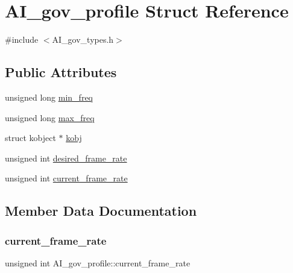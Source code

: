 \hypertarget{structAI__gov__profile}{}\section{A\+I\+\_\+gov\+\_\+profile Struct Reference}
\label{structAI__gov__profile}


{\ttfamily \#include $<$A\+I\+\_\+gov\+\_\+types.\+h$>$}

\subsection*{Public Attributes}
\begin{DoxyCompactItemize}
\item 
unsigned long \hyperlink{structAI__gov__profile_a97f43b9adfda1be183ac0632624abff8}{min\+\_\+freq}
\item 
unsigned long \hyperlink{structAI__gov__profile_a329f428d588d3b19bb5bbac5001a9c61}{max\+\_\+freq}
\item 
struct kobject $\ast$ \hyperlink{structAI__gov__profile_a126166c7cea02562d10c95919fbcd37b}{kobj}
\item 
unsigned int \hyperlink{structAI__gov__profile_a45413274ce202f6fd4c36f2665c600a4}{desired\+\_\+frame\+\_\+rate}
\item 
unsigned int \hyperlink{structAI__gov__profile_a1b82b11b00535d99ddc3cba59d8bc6f3}{current\+\_\+frame\+\_\+rate}
\end{DoxyCompactItemize}


\subsection{Member Data Documentation}
\mbox{\label{structAI__gov__profile_a1b82b11b00535d99ddc3cba59d8bc6f3}} 
\subsubsection{\texorpdfstring{current\+\_\+frame\+\_\+rate}{current\_frame\_rate}}
{\footnotesize\ttfamily unsigned int A\+I\+\_\+gov\+\_\+profile\+::current\+\_\+frame\+\_\+rate}

\mbox{\label{structAI__gov__profile_a45413274ce202f6fd4c36f2665c600a4}} 
